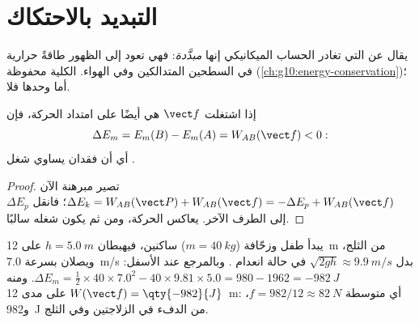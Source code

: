 \section{التبديد بالاحتكاك}

\begin{definition}[التبديد]\label{def:g11:mechanical-energy:dissipation}
يقال عن  التي تغادر الحساب الميكانيكي إنها
\emph{مبدَّدة}: فهي تعود إلى الظهور طاقةً حرارية في
السطحين المتدالكين وفي الهواء.  الكلية محفوظة
(\cref{ch:g10:energy-conservation})؛ أما  وحدها فلا.
\end{definition}

\begin{proposition}\label{prop:g11:mechanical-energy:deficit}
إذا اشتغلت   $\vect f$ هي أيضًا على امتداد الحركة، فإن
\[
\Delta E_m = E_m(B) - E_m(A) = W_{AB}(\vect f) < 0:
\]
أي أن فقدان  يساوي شغل .
\end{proposition}

\begin{proof}
تصير مبرهنة  الآن $\Delta E_k = W_{AB}(\vect P) +
W_{AB}(\vect f) = -\Delta E_p + W_{AB}(\vect f)$؛ فانقل $\Delta E_p$
إلى الطرف الآخر.  يعاكس الحركة، ومن ثم يكون شغله سالبًا.
\end{proof}

\begin{example}\label{ex:g11:mechanical-energy:toboggan}
يبدأ طفل وزحّافة ($m = \qty{40}{kg}$) ساكنين، فيهبطان
$h = \qty{5.0}{m}$ على \qty{12}{m} من الثلج، ويصلان بسرعة
\qty{7.0}{m/s} بدل $\sqrt{2gh} \approx \qty{9.9}{m/s}$
في حالة انعدام . وبالمرجع عند الأسفل:
$\Delta E_m = \tfrac12 \times 40 \times 7.0^2 - 40 \times 9.81
\times 5.0 = 980 - 1962 = \qty{-982}{J}$. ومنه $W(\vect f) =
\qty{-982}{J}$ على مدى \qty{12}{m}: أي   متوسطة
$f = 982/12 \approx \qty{82}{N}$، و\qty{982}{J} من الدفء في
الزلاجتين وفي الثلج.
\end{example}

